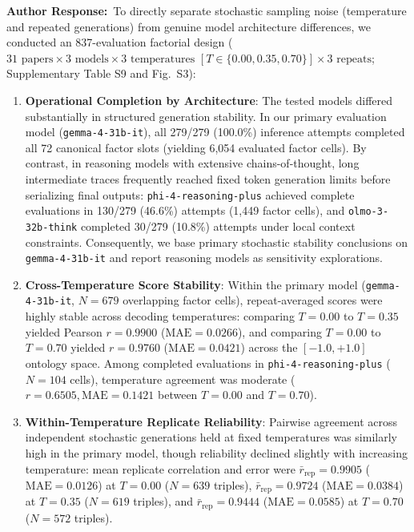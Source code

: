 \documentclass[11pt]{article}
\newcommand{\authorsresponse}{\noindent\textbf{\color{black}Author Response:}\ }
\begin{document}
\authorsresponse To directly separate stochastic sampling noise (temperature and repeated generations) from genuine model architecture differences, we conducted an 837-evaluation factorial design ($31\text{ papers} \times 3\text{ models} \times 3\text{ temperatures } [T \in \{0.00, 0.35, 0.70\}] \times 3\text{ repeats}$; Supplementary Table S9 and Fig.~S3):
\begin{enumerate}[leftmargin=*,noitemsep]
\item \textbf{Operational Completion by Architecture}: 
The tested models differed substantially in structured generation stability. In our primary evaluation model (\texttt{gemma-4-31b-it}), all 279/279 (100.0\%) inference attempts completed all 72 canonical factor slots (yielding 6,054 evaluated factor cells). By contrast, in reasoning models with extensive chains-of-thought, long intermediate traces frequently reached fixed token generation limits before serializing final outputs: \texttt{phi-4-reasoning-plus} achieved complete evaluations in 130/279 (46.6\%) attempts (1,449 factor cells), and \texttt{olmo-3-32b-think} completed 30/279 (10.8\%) attempts under local context constraints. Consequently, we base primary stochastic stability conclusions on \texttt{gemma-4-31b-it} and report reasoning models as sensitivity explorations.

\item \textbf{Cross-Temperature Score Stability}: 
Within the primary model (\texttt{gemma-4-31b-it}, $N=679$ overlapping factor cells), repeat-averaged scores were highly stable across decoding temperatures: comparing $T=0.00$ to $T=0.35$ yielded Pearson $r = 0.9900$ ($\text{MAE} = 0.0266$), and comparing $T=0.00$ to $T=0.70$ yielded $r = 0.9760$ ($\text{MAE} = 0.0421$) across the $[-1.0, +1.0]$ ontology space. Among completed evaluations in \texttt{phi-4-reasoning-plus} ($N=104$ cells), temperature agreement was moderate ($r = 0.6505, \text{MAE} = 0.1421$ between $T=0.00$ and $T=0.70$).

\item \textbf{Within-Temperature Replicate Reliability}: 
Pairwise agreement across independent stochastic generations held at fixed temperatures was similarly high in the primary model, though reliability declined slightly with increasing temperature: mean replicate correlation and error were $\bar{r}_{\text{rep}} = 0.9905$ ($\text{MAE} = 0.0126$) at $T=0.00$ ($N=639$ triples), $\bar{r}_{\text{rep}} = 0.9724$ ($\text{MAE} = 0.0384$) at $T=0.35$ ($N=619$ triples), and $\bar{r}_{\text{rep}} = 0.9444$ ($\text{MAE} = 0.0585$) at $T=0.70$ ($N=572$ triples).


\end{enumerate}
\end{document}
